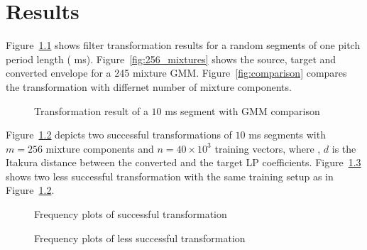 \chapter{Results} %
\label{cha:results}
Figure~\ref{fig:frequency_plots_1} shows filter transformation results for a random segments of one pitch period length ( ms). Figure~\ref{fig:256_mixtures} shows the source, target and converted envelope for a 245 mixture GMM. Figure~\ref{fig:comparison} compares the transformation with differnet number of mixture components.
\begin{figure}[htbp]
	\begin{center}
	\caption{Transformation result of a $10$ ms segment with GMM comparison}
	\label{fig:frequency_plots_1}
	\end{center}
\end{figure}

Figure~\ref{fig:frequency_plots_2} depicts two successful transformations of $10$ ms segments with $m=256$ mixture components and $n=40\times 10^3$ training vectors, where , $d$ is the Itakura distance between the converted and the target LP coefficients. Figure~\ref{fig:frequency_plots_3} shows two less successful transformation with the same training setup as in Figure~\ref{fig:frequency_plots_2}.
\begin{figure}[htbp]
	\begin{center}
	\caption{Frequency plots of successful transformation}
	\label{fig:frequency_plots_2}
	\end{center}
\end{figure}
\begin{figure}[htbp]
	\begin{center}
	\caption{Frequency plots of less successful transformation}
	\label{fig:frequency_plots_3}
	\end{center}
\end{figure}



